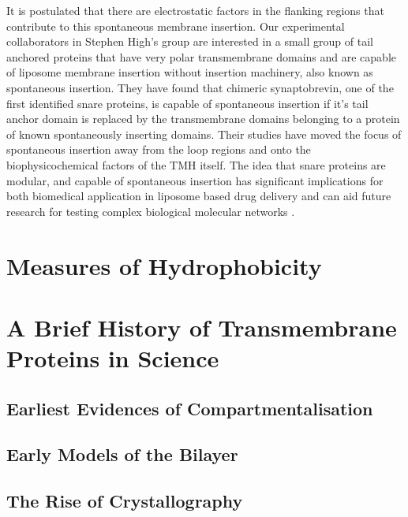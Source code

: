 It is postulated that there are electrostatic factors in the flanking regions that contribute to this spontaneous membrane insertion. Our experimental collaborators in Stephen High’s group are interested in a small group of tail anchored proteins that have very polar transmembrane domains and are capable of liposome membrane insertion without insertion machinery, also known as spontaneous insertion. They have found that chimeric synaptobrevin, one of the first identified \gls{snare} proteins, is capable of spontaneous insertion if it’s tail anchor domain is replaced by the transmembrane domains belonging to a protein of known spontaneously inserting domains. Their studies have moved the focus of spontaneous insertion away from the loop regions and onto the biophysicochemical factors of the TMH itself. The idea that \gls{snare} proteins are modular, and capable of spontaneous insertion has significant implications for both biomedical application in liposome based drug delivery and can aid future research for testing complex biological molecular networks \cite{Allen2013, Nordlund2014}.

\section{Measures of Hydrophobicity}

\section{A Brief History of Transmembrane Proteins in Science}
\subsection{Earliest Evidences of Compartmentalisation}


\subsection{Early Models of the Bilayer}

\subsection{The Rise of Crystallography}

